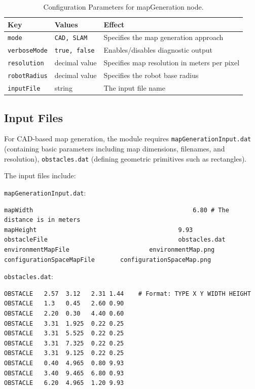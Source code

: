 \documentclass{CSSRforAfrica}
\begin{document}
\begin{table}[H]
\centering
\caption{Configuration Parameters for mapGeneration node.}
\label{tab:mapGenerationConfiguration.ini}
\begin{tabular}{|l|l|p{7cm}|}
\hline
\textbf{Key} & \textbf{Values} & \textbf{Effect} \\ \hline
\texttt{mode} & \texttt{CAD, SLAM} & Specifies the map generation approach \\ \hline
\texttt{verboseMode} & \texttt{true, false} & Enables/disables diagnostic output \\ \hline
\texttt{resolution} & decimal value & Specifies map resolution in meters per pixel \\ \hline
\texttt{robotRadius} & decimal value & Specifies the robot base radius \\ \hline
\texttt{inputFile} & string & The input file name \\ \hline
\end{tabular}
\end{table}

\subsection*{Input Files}

For CAD-based map generation, the module requires \texttt{mapGenerationInput.dat} (containing basic parameters including map dimensions, filenames, and resolution), \texttt{obstacles.dat} (defining geometric primitives such as rectangles).

\newpage

\noindent The input files include:

\noindent \texttt{mapGenerationInput.dat}:
\begin{lstlisting}[style=withoutNumbering]
mapWidth 											6.80 # The distance is in meters          			
mapHeight 										9.93							
obstacleFile 									obstacles.dat  			
environmentMapFile 						environmentMap.png 	
configurationSpaceMapFile 		configurationSpaceMap.png   
\end{lstlisting}

\noindent \texttt{obstacles.dat}:
\begin{lstlisting}[style=withoutNumbering]
OBSTACLE   2.57  3.12   2.31 1.44    # Format: TYPE X Y WIDTH HEIGHT
OBSTACLE   1.3   0.45   2.60 0.90
OBSTACLE   2.20  0.30   4.40 0.60
OBSTACLE   3.31  1.925  0.22 0.25
OBSTACLE   3.31  5.525  0.22 0.25
OBSTACLE   3.31  7.325  0.22 0.25
OBSTACLE   3.31  9.125  0.22 0.25
OBSTACLE   0.40  4.965  0.80 9.93
OBSTACLE   3.40  9.465  6.80 0.93
OBSTACLE   6.20  4.965  1.20 9.93

\end{lstlisting}
\end{document}
